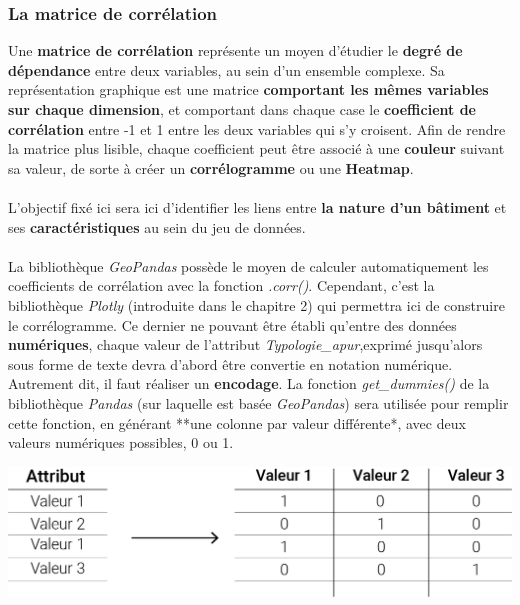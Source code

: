\documentclass[
  11pt,
  french,
]{article}
\newcounter{customfigs}[section]
\newenvironment{customfigs}[1][] {
    \stepcounter{customfigs}
    Fig \arabic{section}. \arabic{customfigs} : }
\newcommand{\masked}{\vspace*{-\baselineskip}}
\begin{document}
\hypertarget{la-matrice-de-corruxe9lation}{%
\subsubsection{La matrice de
corrélation}\label{la-matrice-de-corruxe9lation}}

Une \textbf{matrice de corrélation} représente un moyen d'étudier le
\textbf{degré de dépendance} entre deux variables, au sein d'un ensemble
complexe. Sa représentation graphique est une matrice \textbf{comportant
les mêmes variables sur chaque dimension}, et comportant dans chaque
case le \textbf{coefficient de corrélation} entre -1 et 1 entre les deux
variables qui s'y croisent. Afin de rendre la matrice plus lisible,
chaque coefficient peut être associé à une \textbf{couleur} suivant sa
valeur, de sorte à créer un \textbf{corrélogramme} ou une
\textbf{Heatmap}.\\
~\\
L'objectif fixé ici sera ici d'identifier les liens entre \textbf{la
nature d'un bâtiment} et ses \textbf{caractéristiques} au sein du jeu de
données.\\
~\\
La bibliothèque \emph{GeoPandas} possède le moyen de calculer
automatiquement les coefficients de corrélation avec la fonction
\emph{.corr()}. Cependant, c'est la bibliothèque \emph{Plotly}
(introduite dans le chapitre 2) qui permettra ici de construire le
corrélogramme. Ce dernier ne pouvant être établi qu'entre des données
\textbf{numériques}, chaque valeur de l'attribut
\emph{Typologie\_apur},exprimé jusqu'alors sous forme de texte devra
d'abord être convertie en notation numérique. Autrement dit, il faut
réaliser un \textbf{encodage}. La fonction \emph{get\_dummies()} de la
bibliothèque \emph{Pandas} (sur laquelle est basée \emph{GeoPandas})
sera utilisée pour remplir cette fonction, en générant **une colonne par
valeur différente*, avec deux valeurs numériques possibles, 0 ou 1.

\begin{tcolorbox}[title=\begin{customfigs} Illustration de l'encodage réalisé \end{customfigs}]

\begin{center}\includegraphics[width=1\linewidth]{__imgs/encode} \end{center}

\end{tcolorbox}
\end{document}
